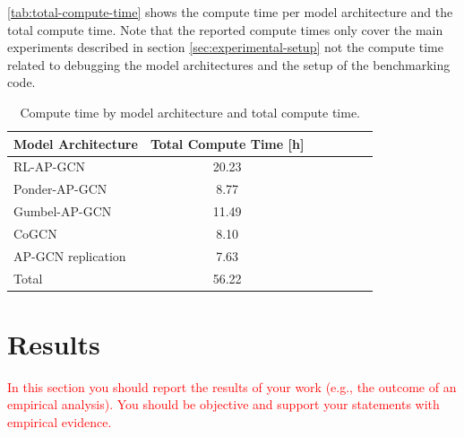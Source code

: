 \documentclass{gdl}
\begin{document}
\autoref{tab:total-compute-time} shows the compute time per model architecture and the total compute time. Note that the reported compute times only cover the main experiments described in section \ref{sec:experimental-setup} not the compute time related to debugging the model architectures and the setup of the benchmarking code.

\begin{table}[h]
    \small\sf
    \setlength{\tabcolsep}{2pt}
    \caption{Compute time by model architecture and total compute time.}
    \begin{tabular}{l c c c c c c}
        \toprule
        Model Architecture & Total Compute Time [h]\\
        \midrule
        RL-AP-GCN & 20.23 \\
        Ponder-AP-GCN & 8.77 \\
        Gumbel-AP-GCN & 11.49 \\
        CoGCN & 8.10   \\
        AP-GCN replication & 7.63  \\
        \midrule
        Total & 56.22 \\
        \bottomrule
    \end{tabular}
    \label{tab:total-compute-time}
\end{table}


\section{Results}

\textcolor{red}{In this section you should report the results of your work (e.g., the outcome of an empirical analysis). You should be objective and support your statements with empirical evidence.}
\end{document}
